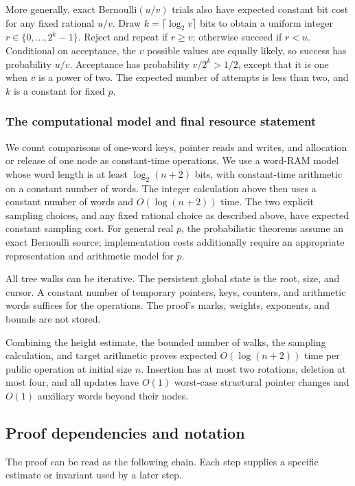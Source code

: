 \documentclass[11pt,a4paper]{article}
\theoremstyle{readable}
\begin{document}
More generally, exact Bernoulli$(u/v)$ trials also have expected
constant bit cost for any fixed rational $u/v$. Draw
$k=\lceil\log_2 v\rceil$ bits to obtain a uniform integer
$r\in\{0,\ldots,2^k-1\}$. Reject and repeat if $r\ge v$;
otherwise succeed if $r<u$. Conditional on acceptance, the $v$
possible values are equally likely, so success has probability $u/v$.
Acceptance has probability $v/2^k>1/2$, except that it is one when
$v$ is a power of two. The expected number of attempts is less than
two, and $k$ is a constant for fixed $p$.

\subsubsection*{The computational model and final resource statement}
We count comparisons of one-word keys, pointer reads and writes, and
allocation or release of one node as constant-time operations. We use
a word-RAM model whose word length is at least $\log_2(n+2)$ bits,
with constant-time arithmetic on a constant number of words. The
integer calculation above then uses a constant number of words and
$O(\log(n+2))$ time. The two explicit sampling choices, and any
fixed rational choice as described above, have expected constant
sampling cost. For general real $p$, the probabilistic theorems
assume an exact Bernoulli source; implementation costs additionally
require an appropriate representation and arithmetic model for $p$.

All tree walks can be iterative. The persistent global state is the
root, size, and cursor. A constant number of temporary pointers,
keys, counters, and arithmetic words suffices for the operations.
The proof's marks, weights, exponents, and bounds are not stored.

Combining the height estimate, the bounded number of walks, the
sampling calculation, and target arithmetic proves expected
$O(\log(n+2))$ time per public operation at initial size $n$.
Insertion has at most two rotations, deletion at most four, and all
updates have $O(1)$ worst-case structural pointer changes and
$O(1)$ auxiliary words beyond their nodes.

\subsection{Proof dependencies and notation}
\label{sec:notation}

The proof can be read as the following chain. Each step supplies a
specific estimate or invariant used by a later step.
\end{document}
